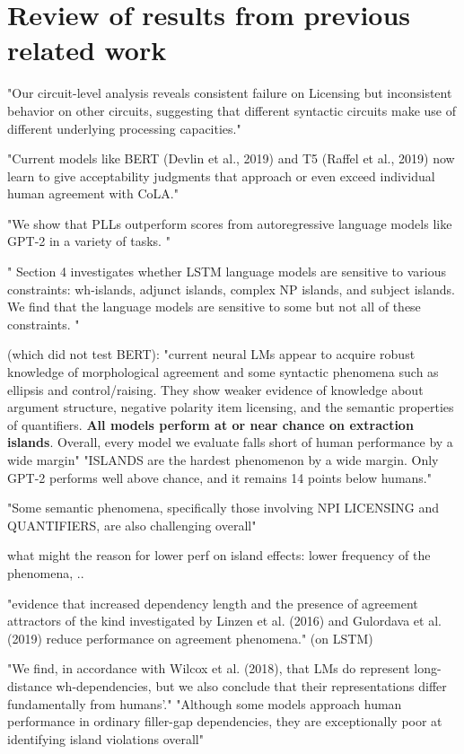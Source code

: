 \section{Review of results from previous related work}

"Our circuit-level analysis reveals consistent failure on Licensing but inconsistent behavior on other circuits, suggesting that different syntactic circuits make use of different underlying processing capacities."  \citep{hu2020systematic} 


"Current models like BERT (Devlin et al., 2019) and T5 (Raffel et al., 2019) now learn to give acceptability judgments that approach or even exceed individual human agreement with CoLA." \citep{warstadt2020blimp}	

"We show that PLLs outperform scores from autoregressive language models like GPT-2 in a variety of tasks. " \citep{salazar2020masked}

" Section 4 investigates whether
LSTM language models are sensitive to various
constraints: wh-islands, adjunct islands, complex
NP islands, and subject islands. We find that the
language models are sensitive to some but not all
of these constraints. " \citep{wilcox2018rnn}

\citet{warstadt2020blimp} (which did not test BERT): "current neural LMs appear to acquire robust
knowledge of morphological agreement and some syntactic phenomena such as ellipsis and control/raising. They show weaker evidence of knowledge about argument structure, negative polarity item licensing, and the semantic properties of quantifiers. \textbf{All models perform at or near chance on extraction islands}. Overall, every model we evaluate falls short of human performance by a wide margin"
"ISLANDS are the hardest phenomenon by a wide margin. Only GPT-2 performs well above
chance, and it remains 14 points below humans." \citet{warstadt2020blimp}

"Some semantic phenomena, specifically those involving NPI LICENSING and QUANTIFIERS, are also challenging overall"

what might the reason for lower perf on island effects: lower frequency of the phenomena, ..

"evidence that increased dependency length and the presence of agreement attractors of the kind investigated by Linzen et al. (2016) and Gulordava et al. (2019) reduce performance on agreement phenomena." (on LSTM) \citet{warstadt2020blimp}

"We find, in accordance with Wilcox et al.
(2018), that LMs do represent long-distance
wh-dependencies, but we also conclude that
their representations differ fundamentally from humans’." \citet{warstadt2020blimp}
"Although some models approach human
performance in ordinary filler-gap dependencies,
they are exceptionally poor at identifying island
violations overall" \citet{warstadt2020blimp}

